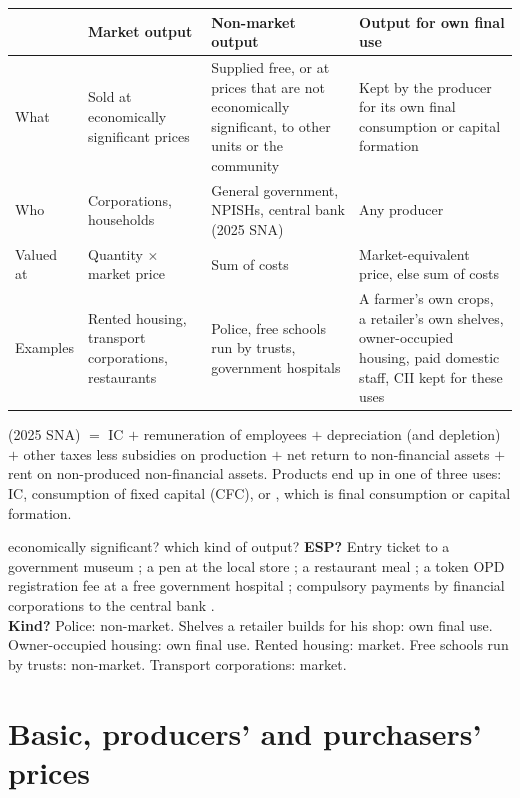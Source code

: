 \begin{center}\small
\begin{tabularx}{\textwidth}{@{}l X X X@{}}
\toprule
& \textbf{Market output} & \textbf{Non-market output} & \textbf{Output for own final use} \\
\midrule
What & Sold at economically significant prices & Supplied free, or at prices that are not
economically significant, to other units or the community & Kept by the producer for its own
final consumption or capital formation \\
Who & Corporations, households & General government, NPISHs, central bank (2025 SNA) & Any
producer \\
Valued at & Quantity $\times$ market price & Sum of costs & Market-equivalent price, else sum
of costs \\
Examples & Rented housing, transport corporations, restaurants & Police, free schools run by
trusts, government hospitals & A farmer's own crops, a retailer's own shelves, owner-occupied
housing, paid domestic staff, CII kept for these uses \\
\bottomrule
\end{tabularx}
\end{center}

 (2025 SNA) $=$ IC $+$ remuneration of employees $+$ depreciation (and
depletion) $+$ other taxes less subsidies on production $+$ net return to non-financial assets
$+$ rent on non-produced non-financial assets. Products end up in one of three uses: IC,
consumption of fixed capital (CFC), or , which is final consumption or capital
formation.

\begin{quick}{economically significant? which kind of output?}
\small \textbf{ESP?} Entry ticket to a government museum \no; a pen at the local store \yes; a
restaurant meal \yes; a token OPD registration fee at a free government hospital \no; compulsory
payments by financial corporations to the central bank \no.\\
\textbf{Kind?} Police: non-market. Shelves a retailer builds for his shop: own final use.
Owner-occupied housing: own final use. Rented housing: market. Free schools run by trusts:
non-market. Transport corporations: market.
\end{quick}

\section{Basic, producers' and purchasers' prices}\label{sec:prices}

